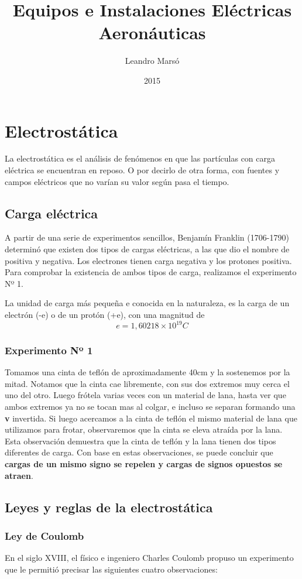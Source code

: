 \documentclass{article}
\title{Equipos e Instalaciones Eléctricas Aeronáuticas}
\author{Leandro Marsó}
\date{2015}
\begin{document}
\maketitle
\pagebreak
\tableofcontents
\pagebreak
	\section{Electrostática}
La electrostática es el análisis de fenómenos en que las partículas con carga eléctrica se encuentran en reposo. O por decirlo de otra forma, con fuentes y campos eléctricos que no varían su valor según pasa el tiempo.

	\subsection{Carga eléctrica}
A partir de una serie de experimentos sencillos, Benjamín Franklin (1706-1790) determinó que existen dos tipos de cargas eléctricas, a las que dio el nombre de positiva y negativa. Los electrones tienen carga negativa y los protones positiva. Para comprobar la
existencia de ambos tipos de carga, realizamos el experimento Nº 1.

La unidad de carga más pequeña e conocida en la naturaleza, es la carga de un electrón (-e) o de un protón (+e), con una magnitud de
$$ e = 1,602 18 \times 10^{19} C$$

\subsubsection*{Experimento Nº 1}
Tomamos una cinta de teflón de aproximadamente 40cm y la sostenemos por la mitad. Notamos que la cinta cae libremente, con sus dos extremos muy cerca el uno del otro. Luego frótela varias veces con un material de lana, hasta ver que ambos extremos ya no se tocan mas al colgar, e incluso se separan formando una \textbf{v} invertida. Si luego acercamos a la cinta de teflón el mismo material de lana que utilizamos para frotar, observaremos que la cinta se eleva atraída por la lana. Esta observación demuestra que la cinta de teflón y la lana tienen dos tipos diferentes de carga. Con base en estas observaciones, se puede concluir que \textbf{cargas de un mismo signo se repelen y cargas de signos opuestos se atraen}.

	\subsection{Leyes y reglas de la electrostática}
	\subsubsection*{Ley de Coulomb}
En el siglo XVIII, el físico e ingeniero Charles Coulomb propuso un experimento que le permitió precisar las siguientes cuatro observaciones:
\end{document}
